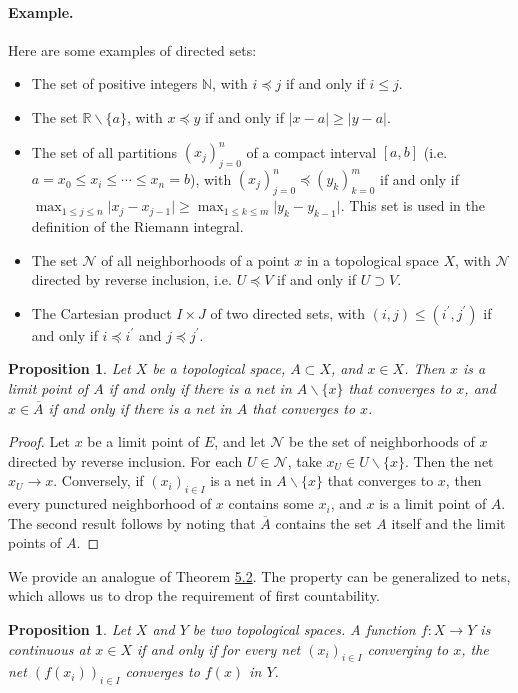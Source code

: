 \documentclass{article}
\numberwithin{equation}{section}
\newcommand{\bbN}{\mathbb{N}}
\newcommand{\bbR}{\mathbb{R}}
\newcommand{\ol}{\overline}
\theoremstyle{plain}
\newtheorem{proposition}[theorem]{Proposition}
\theoremstyle{definition}
\begin{document}
\paragraph{Example.} Here are some examples of directed sets:
\begin{itemize}
	\item The set of positive integers $\bbN$, with $i\preceq j$ if and only if $i\leq j$.
	\item The set $\bbR\backslash\{a\}$, with $x\preceq y$ if and only if $\vert x-a\vert\geq\vert y-a\vert$. 
	\item The set of all partitions $(x_j)_{j=0}^n$ of a compact interval $[a,b]$ (i.e. $a=x_0\leq x_i\leq\cdots\leq x_n=b$), with $(x_j)_{j=0}^n\preceq(y_k)_{k=0}^m$ if and only if $\max_{1\leq j\leq n}\vert x_j-x_{j-1}\vert\geq \max_{1\leq k\leq m}\vert y_k-y_{k-1}\vert$. This set is used in the definition of the Riemann integral.
	\item The set $\mathscr{N}$ of all neighborhoods of a point $x$ in a topological space $X$, with $\mathscr{N}$ directed by reverse inclusion, i.e. $U\preceq V$ if and only if $U\supset V$. 
	\item The Cartesian product $I\times J$ of two directed sets, with $(i,j)\leq (i^\prime,j^\prime)$ if and only if $i\preceq i^\prime$ and $j\preceq j^\prime$.
\end{itemize}
\begin{proposition}\label{netacc}
Let $X$ be a topological space, $A\subset X$, and $x\in X$. Then $x$ is a limit point of $A$ if and only if there is a net in $A\backslash\{x\}$ that converges to $x$, and $x\in\ol{A}$ if and only if there is a net in $A$ that converges to $x$.
\end{proposition}
\begin{proof}
Let $x$ be a limit point of $E$, and let $\mathscr{N}$ be the set of neighborhoods of $x$ directed by reverse inclusion. For each $U\in\mathscr{N}$, take $x_U\in U\backslash\{x\}$. Then the net $x_U\to x$. Conversely, if $(x_i)_{i\in I}$ is a net in $A\backslash\{x\}$ that converges to $x$, then every punctured neighborhood of $x$ contains some $x_i$, and $x$ is a limit point of $A$. The second result follows by noting that $\ol{A}$ contains the set $A$ itself and the limit points of $A$.
\end{proof}

We provide an analogue of Theorem \hyperref[thm:5.2]{5.2}. The property can be generalized to nets, which allows us to drop the requirement of first countability.
\begin{proposition}\label{netconvcont}
Let $X$ and $Y$ be two topological spaces. A function $f:X\to Y$ is continuous at $x\in X$ if and only if for every net $(x_i)_{i\in I}$ converging to $x$, the net $(f(x_i))_{i\in I}$ converges to $f(x)$ in $Y$.
\end{proposition}
\end{document}
